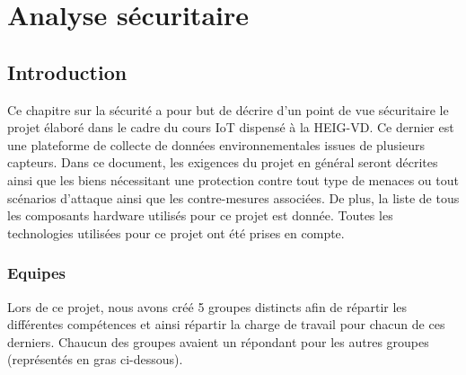 \chapter{Analyse sécuritaire}
\section{Introduction}
Ce chapitre sur la sécurité a pour but de décrire d'un point de vue sécuritaire le projet élaboré dans le cadre du cours IoT dispensé à la HEIG-VD. Ce dernier est une plateforme de collecte de données environnementales issues de plusieurs capteurs. Dans ce document, les exigences du projet en général seront décrites ainsi que les biens nécessitant une protection contre tout type de menaces ou tout scénarios d'attaque ainsi que les contre-mesures associées. De plus, la liste de tous les composants hardware utilisés pour ce projet est donnée. Toutes les technologies utilisées pour ce projet ont été prises en compte.

\subsection{Equipes}
Lors de ce projet, nous avons créé 5 groupes distincts afin de répartir les différentes compétences et ainsi répartir la charge de travail pour chacun de ces derniers. Chaucun des groupes avaient un répondant pour les autres groupes (représentés en gras ci-dessous).

